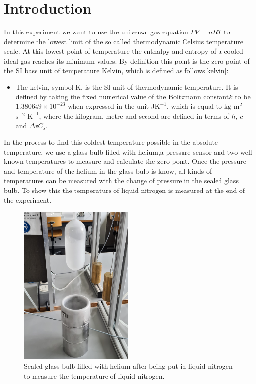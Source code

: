 \section{Introduction}

In this experiment we want to use the universal gas equation ${\displaystyle PV=nRT}$ to determine the lowest limit of the so called thermodynamic Celsius temperature scale.
At this lowest point of temperature the enthalpy and entropy of a cooled ideal gas reaches its minimum values.
By definition this point is the zero point of the SI base unit of temperature Kelvin, which is defined as follows\ref{kelvin}:
\begin{itemize}
	\item The kelvin, symbol K, is the SI unit of thermodynamic temperature. It is defined
	by taking the fixed numerical value of the Boltzmann constant$ k$ to be
	$1.380 649 \times 10^{-23}$ when expressed in the unit \si{\J}$\si{\K}^{-1}$, which is equal to $\si{\kg}$ $\si{\m}^2$ $\si{\s}^{-2}$ $\si{\K}^{-1}$,
	where the kilogram, metre and second are defined in terms of $h$, $c$ and $\Delta vC_s$.
\end{itemize}
 
In the process to find this coldest temperature possible in the absolute temperature, we use a glass bulb filled with helium,a pressure sensor and two well known temperatures to measure and calculate the zero point. 
Once the pressure and temperature of the helium in the glass bulb is know, all kinds of temperatures can be measured with the change of pressure in the sealed glass bulb.
To show this the temperature of liquid nitrogen is measured at the end of the experiment.
\begin{figure}[h]
	\centering
	\includegraphics[width=0.5\textwidth]{sections/images/liquid.jpg}
	\caption{Sealed glass bulb filled with helium after being put in liquid nitrogen to measure the temperature of liquid nitrogen.}
\end{figure}
